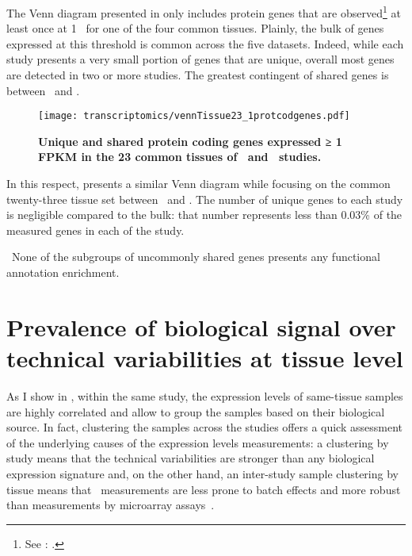The Venn diagram presented in  only includes protein
genes that are observed\footnote{See
: .}
at least once at 1 \FPKM\ for one of the four common tissues.
Plainly, the bulk of genes expressed at this threshold is common
across the five datasets.
Indeed, while each study presents a very small portion of genes
that are unique,
overall most genes are detected in two or more studies.
The greatest contingent of shared genes is between \uhlen\ and \gtex.

\begin{figure}[h]
    \texttt{[image: transcriptomics/vennTissue23\_1protcodgenes.pdf]}\centering
    \caption[Unique and shared protein coding genes expressed
    in the 23 common tissues (≥1 \FPKM)]%
    {\label{fig:ExpGenePcoding1_t23}\textbf{Unique
    and shared protein coding genes expressed ≥ 1 FPKM in the 23 common tissues
    of \uhlen\ and \gtex\ studies.}}
\end{figure}

In this respect,  presents a similar Venn diagram
while focusing on the common twenty-three tissue set between \uhlen\ and \gtex.
The number of unique genes to each study is negligible compared to the bulk:
that number represents less than 0.03\% of the measured genes in each of the study.
\begin{comment}
    Gtex:   462/17551 hence 0.02632329\%
    Uhlen:  281/17551 hence 0.01601048\%
\end{comment}

\NB\ None of the subgroups of uncommonly shared genes presents any functional
annotation enrichment.

\section{Prevalence of biological signal over technical variabilities at
tissue level}
\label{sec:Trans_ReproExpresTissue}

As I show in , within the same study,
the expression levels of same-tissue samples are highly correlated and
allow to group the samples based on their biological source.
In fact, clustering the samples across the studies offers a quick assessment of
the underlying causes of the expression levels measurements:
a clustering by study means that the technical variabilities are stronger
than any biological expression signature and, on the other hand,
an inter-study sample clustering by tissue means that \Rnaseq\ measurements
are less prone to batch effects and more robust than measurements by
microarray assays~.

